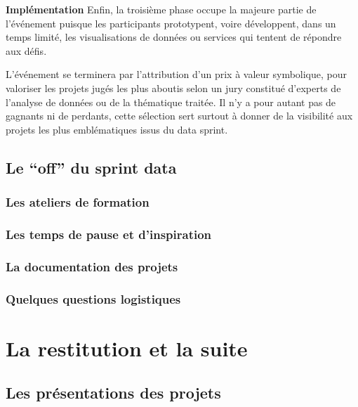 \documentclass[]{book}
\begin{document}
\textbf{Implémentation} Enfin, la troisième phase occupe la majeure
partie de l'événement puisque les participants prototypent, voire
développent, dans un temps limité, les visualisations de données ou
services qui tentent de répondre aux défis.

L'événement se terminera par l'attribution d'un prix à valeur
symbolique, pour valoriser les projets jugés les plus aboutis selon un
jury constitué d'experts de l'analyse de données ou de la thématique
traitée. Il n'y a pour autant pas de gagnants ni de perdants, cette
sélection sert surtout à donner de la visibilité aux projets les plus
emblématiques issus du data sprint.

\section{\texorpdfstring{Le ``off'' du sprint
data}{Le off du sprint data}}\label{le-off-du-sprint-data}

\subsection{Les ateliers de formation}\label{les-ateliers-de-formation}

\subsection{Les temps de pause et
d'inspiration}\label{les-temps-de-pause-et-dinspiration}

\subsection{La documentation des
projets}\label{la-documentation-des-projets}

\subsection{Quelques questions
logistiques}\label{quelques-questions-logistiques}

\chapter{La restitution et la suite}\label{restitution}

\section{Les présentations des
projets}\label{les-presentations-des-projets}
\end{document}
